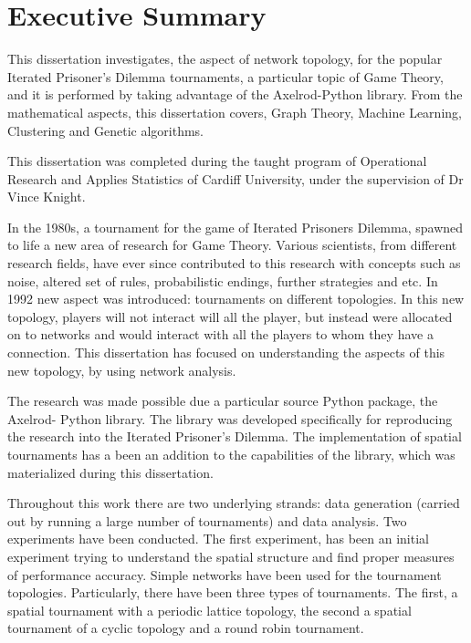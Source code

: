 \chapter{Executive Summary}
This dissertation investigates, the aspect of network topology, for the popular
Iterated Prisoner's Dilemma tournaments, a particular topic of  Game
Theory, and it is performed by taking advantage of the Axelrod-Python library.
From the mathematical aspects, this dissertation covers, Graph Theory,
Machine Learning, Clustering and Genetic algorithms.

This dissertation was completed during the taught program of Operational Research
and Applies Statistics of Cardiff University, under the supervision of Dr Vince
Knight.

In the 1980s, a tournament for the game of Iterated Prisoners Dilemma, spawned to
life a new area of research for Game Theory. Various scientists, from different
research fields, have ever since contributed to this research with concepts
such as noise, altered set of rules, probabilistic endings, further strategies and etc.
In 1992 new aspect was introduced: tournaments on different topologies.
In this new topology, players will not interact will all the player, but instead
were allocated on to networks and would interact with all the players to whom they have a
connection. This dissertation has focused on understanding the aspects of
this new topology, by using network analysis.

The research was made possible due a particular source Python package, the
Axelrod- Python library. The library was developed specifically for
reproducing the research into the Iterated Prisoner's Dilemma. The implementation
of spatial tournaments has a been an addition to the capabilities of the library,
which was materialized during this dissertation. %

Throughout this work there are two underlying strands: data generation (carried
out by running a large number of tournaments) and data analysis.
Two experiments have been conducted. The first experiment, has been an initial
experiment trying to understand the spatial structure and find proper measures
of performance accuracy. Simple networks have been used for the tournament
topologies. Particularly, there have been three types of tournaments.
The first, a spatial tournament with a periodic lattice topology, the
second a spatial tournament of a cyclic topology and a round robin tournament.

